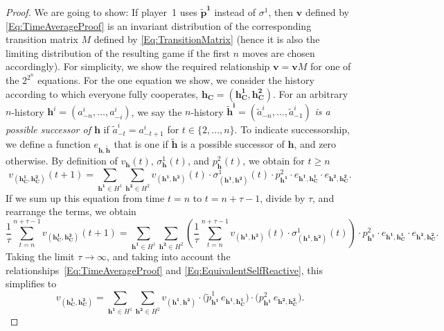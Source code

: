 \documentclass[9pt,twoside,lineno]{pnas-new}
\theoremstyle{plainCl1}
\theoremstyle{plainCl2}
\begin{document}
\begin{proof}
We are going to show: If player~1 uses $\mathbf{\tilde p^1}$ instead of $\sigma^1$, then $\mathbf{v}$ defined by \eqref{Eq:TimeAverageProof} is an invariant distribution of the corresponding transition matrix $M$ defined by \eqref{Eq:TransitionMatrix} (hence it is also the limiting distribution of the resulting game if the first $n$ moves are chosen accordingly). For simplicity, we show the required relationship $\mathbf{v}\!=\!\mathbf{v}M$ for one of the $2^{2^n}$ equations. For the one equation we show, we consider the history according to which everyone fully cooperates, $\mathbf{h_C}\!=\!(\mathbf{h^1_C},\mathbf{ h^2_C})$. For an arbitrary $n$-history $\mathbf{h}^i=(a^i_{-n},\ldots,a^i_{-i})$, we say the $n$-history $\mathbf{\tilde h^i}=(\tilde a^i_{-n},\ldots, \tilde a^i_{-1})$ {\it is a possible successor of $\mathbf{h}$} if $\tilde a^i_{-t} = a^i_{-t+1}$ for $t\!\in\!\{2,\ldots,n\}$. To indicate successorship, we define a function $e_{\mathbf{h},\mathbf{\tilde h}}$ that is one if $\mathbf{\tilde h}$ is a possible successor of $\mathbf{h}$, and zero otherwise. 
By definition of $v_\mathbf{h}(t)$, $\sigma_\mathbf{h}^1(t)$, and $p^2_\mathbf{h}(t)$, we obtain for $t\!\ge\!n$
\begin{equation}
v_{(\mathbf{h^1_C},\mathbf{h^2_C})} (t\!+\!1)
= \sum_{\mathbf{h^1}\in H^1}\sum_{\mathbf{h^2}\in H^2} v_{(\mathbf{h^1},\mathbf{h^2})}(t)\cdot  \sigma^1_{(\mathbf{h^1},\mathbf{h^2})}(t) \cdot p^2_\mathbf{h^1} \cdot e_{\mathbf{h^1},\mathbf{h^1_C}} \cdot e_{\mathbf{h^2},\mathbf{h^2_C}}.
\end{equation}
If we sum up this equation from time $t\!=\!n$ to $t\!=\!n\!+\!\tau\!-\!1$, divide by $\tau$, and rearrange the terms, we obtain
\begin{equation}
\frac{1}{\tau}\sum_{t=n}^{n+\tau-1} v_{(\mathbf{h^1_C},\mathbf{h^2_C})} (t\!+\!1) 
= \sum_{\mathbf{h^1}\in H^1} \sum_{\mathbf{h^2}\in H^2} \left(\frac{1}{\tau}\sum_{t=n}^{n+\tau-1} v_{(\mathbf{h^1},\mathbf{h^2})}(t)\cdot  \sigma^1_{(\mathbf{h^1},\mathbf{h^2})}(t)\right) \cdot p^2_\mathbf{h^1} \cdot e_{\mathbf{h^1},\mathbf{h^1_C}} \cdot e_{\mathbf{h^2},\mathbf{h^2_C}}.
\end{equation}
Taking the limit $\tau\to\infty$, and taking into account the relationships~\eqref{Eq:TimeAverageProof} and \eqref{Eq:EquivalentSelfReactive}, this simplifies to
\begin{equation} 
v_{(\mathbf{h^1_C},\mathbf{h^2_C})}
= \sum_{\mathbf{h^1}\in H^1}\sum_{\mathbf{h^2} \in H^2} v_{(\mathbf{h^1}, \mathbf{h^2})} \cdot \big(\tilde p^1_{\mathbf{h^1}} \, e_{\mathbf{h^1},\mathbf{h^1_C}}\big) \cdot \big(p^2_\mathbf{h^1} \, e_{\mathbf{h^2},\mathbf{h^2_C}}\big).

\end{equation}
\end{proof}
\end{document}

